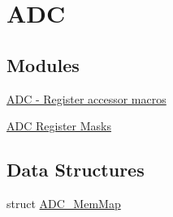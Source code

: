 \hypertarget{group___a_d_c___peripheral}{}\section{A\+D\+C}
\label{group___a_d_c___peripheral}
\subsection*{Modules}
\begin{DoxyCompactItemize}
\item 
\hyperlink{group___a_d_c___register___accessor___macros}{A\+D\+C -\/ Register accessor macros}
\item 
\hyperlink{group___a_d_c___register___masks}{A\+D\+C Register Masks}
\end{DoxyCompactItemize}
\subsection*{Data Structures}
\begin{DoxyCompactItemize}
\item 
struct \hyperlink{struct_a_d_c___mem_map}{A\+D\+C\+\_\+\+Mem\+Map}
\end{DoxyCompactItemize}
